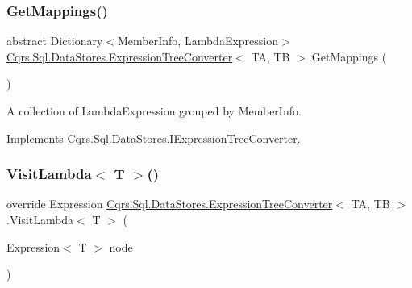 \subsubsection{\texorpdfstring{Get\+Mappings()}{GetMappings()}}
{\footnotesize\ttfamily abstract Dictionary$<$Member\+Info, Lambda\+Expression$>$ \hyperlink{classCqrs_1_1Sql_1_1DataStores_1_1ExpressionTreeConverter}{Cqrs.\+Sql.\+Data\+Stores.\+Expression\+Tree\+Converter}$<$ TA, TB $>$.Get\+Mappings (\begin{DoxyParamCaption}{ }\end{DoxyParamCaption})\hspace{0.3cm}{\ttfamily [pure virtual]}}



A collection of Lambda\+Expression grouped by Member\+Info. 



Implements \hyperlink{interfaceCqrs_1_1Sql_1_1DataStores_1_1IExpressionTreeConverter_ad48480ecf7056a2b2cc079006cc2a589_ad48480ecf7056a2b2cc079006cc2a589}{Cqrs.\+Sql.\+Data\+Stores.\+I\+Expression\+Tree\+Converter}.

\mbox{\label{classCqrs_1_1Sql_1_1DataStores_1_1ExpressionTreeConverter_abf97079f29447cd8e0bcfab91891ccb9_abf97079f29447cd8e0bcfab91891ccb9}} 
\subsubsection{\texorpdfstring{Visit\+Lambda$<$ T $>$()}{VisitLambda< T >()}}
{\footnotesize\ttfamily override Expression \hyperlink{classCqrs_1_1Sql_1_1DataStores_1_1ExpressionTreeConverter}{Cqrs.\+Sql.\+Data\+Stores.\+Expression\+Tree\+Converter}$<$ TA, TB $>$.Visit\+Lambda$<$ T $>$ (\begin{DoxyParamCaption}\item[{Expression$<$ T $>$}]{node }\end{DoxyParamCaption})\hspace{0.3cm}{\ttfamily [protected]}}



